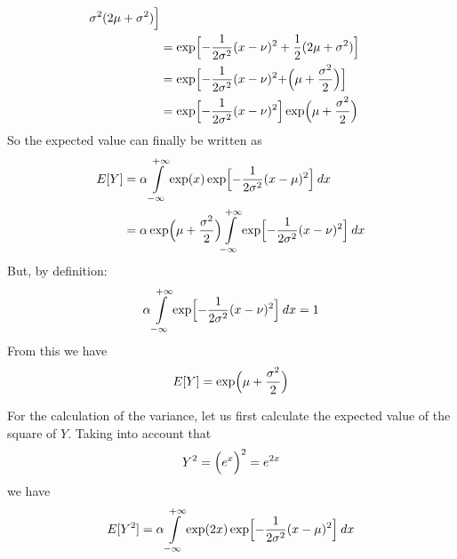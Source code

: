 \documentclass{article}
\begin{document}
\begin{ExerciseList}
{\begin{equation}
\begin{split}
      \sigma^2(2\mu+\sigma^2)
      \Bigr] \\
      &=
      \exp \Bigl[
      -\frac{1}{2\sigma^2}(x - \nu)^2 + \frac{1}{2} 
      (2\mu+\sigma^2)
      \Bigr] \\
      &=
      \exp \Bigl[
      -\frac{1}{2\sigma^2}(x - \nu)^2 +  
      \Bigr(\mu+ \frac{\sigma^2}{2}\Bigl)
      \Bigr] \\
      &=
      \exp \Bigl[
      -\frac{1}{2\sigma^2}(x - \nu)^2\Bigr]
      \exp
      \Bigr(\mu+ \frac{\sigma^2}{2}\Bigl)\\ 
  \end{split}
  \end{equation}
  So the expected value can finally be written as
  \begin{equation}
    \begin{split}
      E[Y] &= \alpha \int\limits_{-\infty}^{+\infty} 
      \exp(x) \exp\Bigl[ 
      -\frac{1}{2\sigma^2}(x -\mu)^2
      \Bigr]   \> dx \\
      &=
      \alpha 
      \exp
      \Bigr(\mu+ \frac{\sigma^2}{2}\Bigl) 
      \int\limits_{-\infty}^{+\infty} 
       \exp\Bigl[ 
      -\frac{1}{2\sigma^2}(x -\nu)^2
      \Bigr] \> dx
    \end{split}
  \end{equation}
  But, by definition:
  $$
      \alpha 
      \int\limits_{-\infty}^{+\infty} 
       \exp\Bigl[ 
      -\frac{1}{2\sigma^2}(x -\nu)^2
      \Bigr] \> dx = 1
  $$
  From this we have 
  \begin{equation}
    E[Y] = \exp
      \Bigr(\mu+ \frac{\sigma^2}{2}\Bigl) 
  \end{equation}
  
  
For the calculation of the variance, let us first calculate the expected value of the square of $Y$. Taking into account that 
  $$Y^2 = \Bigl(e^x\Bigr)^2 = e^{2x}$$
we have
  \begin{equation}
      E[Y^2] = \alpha \int\limits_{-\infty}^{+\infty} 
      \exp(2x) \exp\Bigl[ 
      -\frac{1}{2\sigma^2}(x -\mu)^2
      \Bigr]   \> dx
  \end{equation}
  
}
\end{ExerciseList}
\end{document}
